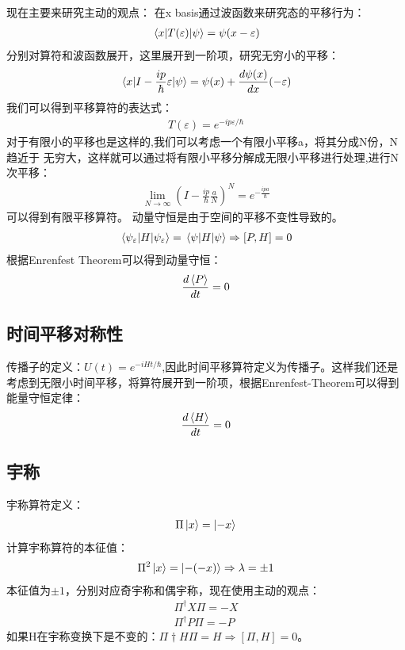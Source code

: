 \documentclass[UTF8]{article}
\numberwithin{equation}{section}
\begin{document}
现在主要来研究主动的观点：
在x basis通过波函数来研究态的平移行为：
\begin{align*}
    \matrixel{x}{T(\varepsilon)}{\psi}=\psi(x-\varepsilon)
\end{align*}
分别对算符和波函数展开，这里展开到一阶项，研究无穷小的平移：
\begin{align*}
    \matrixel{x}{I-\frac{ip}{\hbar}\varepsilon}{\psi}=\psi(x)+\frac{d\psi(x)}{dx}(-\varepsilon)
\end{align*}
我们可以得到平移算符的表达式：
\begin{align*}
    T(\varepsilon)=e^{-ip\varepsilon/\hbar}
\end{align*}
对于有限小的平移也是这样的,我们可以考虑一个有限小平移a，将其分成N份，N趋近于
无穷大，这样就可以通过将有限小平移分解成无限小平移进行处理,进行N次平移：
\begin{align*}
    \lim_{N\rightarrow \infty} (I-\frac{ip}{\hbar}\frac{a}{N})^N=e^{-\frac{ip a}{\hbar}}
\end{align*}
可以得到有限平移算符。
动量守恒是由于空间的平移不变性导致的。
\begin{align*}
    \expval{H}{\psi_{\varepsilon}}=\expval{H}{\psi}\Rightarrow [P,H]=0
\end{align*}
根据Enrenfest Theorem可以得到动量守恒：
\begin{align*}
    \frac{d\expval{P}}{dt}=0
\end{align*}
\subsection{时间平移对称性}
传播子的定义：$U(t)=e^{-iHt/\hbar}$,因此时间平移算符定义为传播子。这样我们还是
考虑到无限小时间平移，将算符展开到一阶项，根据Enrenfest-Theorem可以得到能量守恒定律：
\begin{align*}
    \frac{d\expval{H}}{dt}=0
\end{align*}
\subsection{宇称}
宇称算符定义：
\begin{align*}
    \Pi \ket{x}=\ket{-x}
\end{align*}
计算宇称算符的本征值：
\begin{align*}
    \Pi^2 \ket{x}=\ket{-(-x)}\Rightarrow \lambda = \pm 1
\end{align*}
本征值为$\pm 1$，分别对应奇宇称和偶宇称，现在使用主动的观点：
\begin{align*}
    \Pi^\dagger X \Pi = -X \\
    \Pi^\dagger P\Pi = -P
\end{align*}
如果H在宇称变换下是不变的：$\Pi\dagger H\Pi =H\Rightarrow [\Pi,H]=0$。
\end{document}
